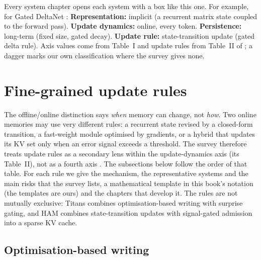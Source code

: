 \begin{taxonomy}[title={How to read the taxonomy boxes in this book}]
Every system chapter opens each system with a box like this one. For example, for Gated DeltaNet
\citep{yang2025gdn}: \textbf{Representation:} implicit (a recurrent matrix state coupled to the
forward pass). \textbf{Update dynamics:} online, every token. \textbf{Persistence:} long-term (fixed
size, gated decay). \textbf{Update rule:} state-transition update (gated delta rule). Axis values
come from Table~I and update rules from Table~II of \citet{zhoubian2026memory}; a dagger marks our
own classification where the survey gives none.
\end{taxonomy}

\section{Fine-grained update rules}\label{sec:c02-rules}

The offline/online distinction says \emph{when} memory can change, not \emph{how}. Two online
memories may use very different rules: a recurrent state revised by a closed-form transition, a
fast-weight module optimised by gradients, or a hybrid that updates its KV set only when an error
signal exceeds a threshold. The survey therefore treats update rules as a secondary lens within
the update-dynamics axis (its Table~II), not as a fourth axis \citep[\S II-B]{zhoubian2026memory}.
The subsections below follow the order of that table. For each rule we give the mechanism, the
representative systems and the main risks that the survey lists, a mathematical template in this
book's notation (the templates are ours) and the chapters that develop it. The rules are not
mutually exclusive: Titans combines optimisation-based writing with surprise gating, and HAM combines state-transition
updates with signal-gated admission into a sparse KV cache.

\subsection{Optimisation-based writing}\label{sec:c02-rule-opt}

